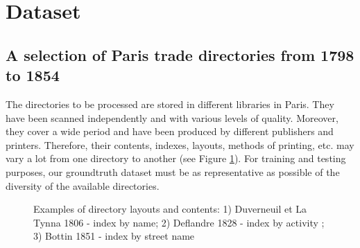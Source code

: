 \section{Dataset}
\label{sec:dataset}






\subsection{A selection of Paris trade directories from 1798 to 1854}

The directories to be processed are stored in different libraries in Paris. They have been scanned independently and with various levels of quality. Moreover, they cover a wide period and have been produced by different publishers and printers. Therefore, their contents, indexes, layouts, methods of printing, etc. may vary a lot from one directory to another (see Figure \ref{fig:directories}). For training and testing purposes, our groundtruth dataset must be as representative as possible of the diversity of the available directories.


\begin{figure}[htb!]
	  \caption{\label{fig:directories} Examples of directory layouts and contents: 1) Duverneuil et La Tynna 1806 - index by name; 2) Deflandre 1828 - index by activity ; 3) Bottin 1851 - index by street name}
\end{figure}


